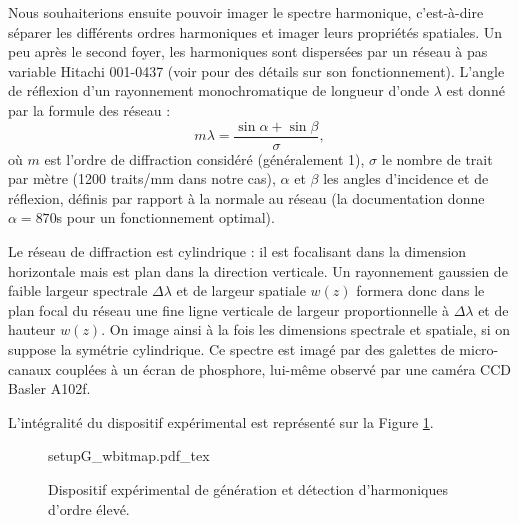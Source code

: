 Nous souhaiterions ensuite pouvoir imager le spectre harmonique, c'est-à-dire séparer les différents ordres harmoniques et imager leurs propriétés spatiales. Un peu après le second foyer, les harmoniques sont dispersées par un réseau à pas variable Hitachi 001-0437 (voir  pour des détails sur son fonctionnement). L'angle de réflexion d'un rayonnement monochromatique de longueur d'onde $\lambda$ est donné par la formule des réseau :
\begin{equation*}
m\lambda=\frac{\sin{\alpha}+\sin{\beta}}{\sigma},
\end{equation*}
où $m$ est l'ordre de diffraction considéré (généralement 1), $\sigma$ le nombre de trait par mètre (1200 traits/mm dans notre cas), $\alpha$ et $\beta$ les angles d'incidence et de réflexion, définis par rapport à la normale au réseau (la documentation donne $\alpha = 87$\degre0s{} pour un fonctionnement optimal).\par
Le réseau de diffraction est cylindrique : il est focalisant dans la dimension horizontale mais est plan dans la direction verticale. Un rayonnement gaussien de faible largeur spectrale $\Delta\lambda$ et de largeur spatiale $w(z)$ formera donc dans le plan focal du réseau une fine ligne verticale de largeur proportionnelle à $\Delta\lambda$ et de hauteur $w(z)$. On image ainsi à la fois les dimensions spectrale et spatiale, si on suppose la symétrie cylindrique. Ce spectre est imagé par des galettes de micro-canaux couplées à un écran de phosphore, lui-même observé par une caméra CCD Basler A102f. 

L'intégralité du dispositif expérimental est représenté sur la Figure \ref{Fig:ExpG}.
\newpage
\vspace{\baselineskip}
\begin{figure}[!ht]
\centering
\def\svgwidth{\columnwidth}
{setupG_wbitmap.pdf_tex}
\caption{Dispositif expérimental de génération et détection d'harmoniques d'ordre élevé.}
\label{Fig:ExpG}
\end{figure}

